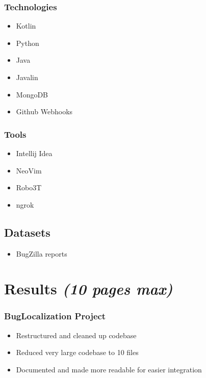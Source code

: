 \documentclass[12pt]{article}
\providecommand{\tightlist}{%
  \setlength{\itemsep}{0pt}\setlength{\parskip}{0pt}}
\begin{document}
\hypertarget{technologies}{%
\subsubsection{Technologies}\label{technologies}}

\begin{itemize}
\tightlist
\item
  Kotlin
\item
  Python
\item
  Java
\item
  Javalin
\item
  MongoDB
\item
  Github Webhooks
\end{itemize}

\hypertarget{tools}{%
\subsubsection{Tools}\label{tools}}

\begin{itemize}
\tightlist
\item
  Intellij Idea
\item
  NeoVim
\item
  Robo3T
\item
  ngrok
\end{itemize}

\hypertarget{datasets}{%
\subsection{Datasets}\label{datasets}}

\begin{itemize}
\tightlist
\item
  BugZilla reports
\end{itemize}

\hypertarget{results-10-pages-max}{%
\section{\texorpdfstring{Results \emph{(10 pages
max)}}{Results (10 pages max)}}\label{results-10-pages-max}}

\hypertarget{buglocalization-project}{%
\subsubsection{BugLocalization Project}\label{buglocalization-project}}

\begin{itemize}
\tightlist
\item
  Restructured and cleaned up codebase
\item
  Reduced very large codebase to 10 files
\item
  Documented and made more readable for easier integration
\end{itemize}
\end{document}

